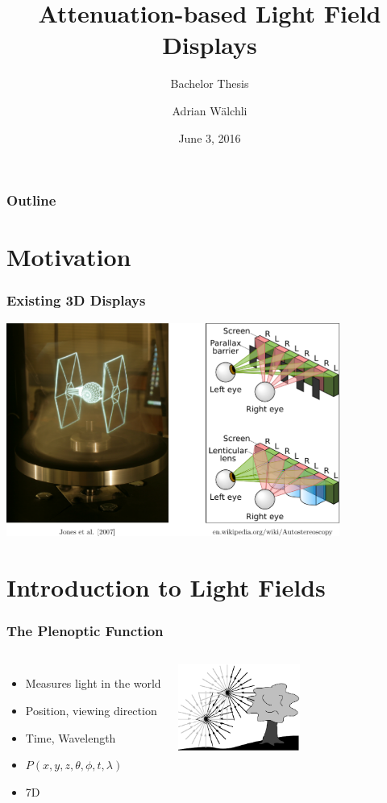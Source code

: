 \documentclass[12pt, compress]{beamer}
\title{Attenuation-based Light Field Displays}
\subtitle{Bachelor Thesis}
\date{June 3, 2016}
\author{Adrian W\"alchli}
\institute{Institut f\"ur Informatik und angewandte Mathematik}
\begin{document}
\setlength{\leftmargini}{0pt}
\setlength{\fboxsep}{0pt}%

\maketitle

\begin{frame}[fragile]
	\frametitle{Outline}
	\tableofcontents
\end{frame}

\section{Motivation}

\begin{frame}[fragile]
	\frametitle{Existing 3D Displays}
	\includegraphics[height = 7cm]{figures/overview_displays/existing_3d_displays.pdf}
\end{frame}

\section{Introduction to Light Fields}

\begin{frame}[fragile]
	\frametitle{The Plenoptic Function}
	
	\begin{columns}[onlytextwidth]
			\begin{itemize}[<alert@+>]
				\item Measures light in the world
				\item Position, viewing direction
				\item Time, Wavelength
				\item $P(x, y, z, \theta, \phi, t, \lambda)$
				\item 7D
			\end{itemize}
			\vspace{-5cm}
			\includegraphics[width = 4cm]{images/plenoptic.png}
	\end{columns}
	
\end{frame}
\end{document}
